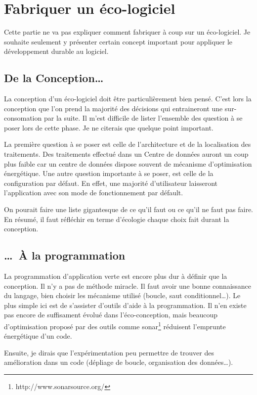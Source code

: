 \documentclass[a4paper, 11pt]{report}
\begin{document}
	\section{Fabriquer un éco-logiciel}
Cette partie ne va pas expliquer comment fabriquer à coup sur un éco-logiciel. Je souhaite seulement y présenter certain concept important pour appliquer le développement durable au logiciel.
		\subsection{De la Conception\ldots}
La conception d'un éco-logiciel doit être particulièrement bien pensé. C'est lors la conception que l'on prend la majorité des décisions qui entraineront une sur-consomation par la suite. Il m'est difficile de lister l'ensemble des question à se poser lors de cette phase. Je ne citerais que quelque point important.

La première question à se poser est celle de l'architecture et de la localisation des traitements\cite{EcoLogiciels}. Des traitements effectué dans un Centre de données auront un coup plus faible car un centre de données dispose souvent de mécanisme d'optimisation énergétique. Une autre question importante à se poser, est celle de la configuration par défaut\cite{GreenPattern}. En effet, une majorité d'utilisateur laisseront l'application avec son mode de fonctionnement par défault.

On pourait faire une liste gigantesque de ce qu'il faut ou ce qu'il ne faut pas faire. En résumé, il faut réfléchir en terme d'écologie chaque choix  fait durant la conception.

		\subsection{\ldots~À la programmation}
La programmation d'application verte est encore plus dur à définir que la conception. Il n'y a pas de méthode miracle. Il faut avoir une bonne connaissance du langage, bien choisir les mécanisme utilisé (boucle, saut conditionnel\ldots). Le plus simple ici est de s'assister d'outils d'aide à la programmation. Il n'en existe pas encore de suffisament évolué dans l'éco-conception, mais beaucoup d'optimisation proposé par des outils comme sonar\footnote{http://www.sonarsource.org/} réduisent l'emprunte énergétique d'un code.

Ensuite, je dirais que l'expérimentation peu permettre de trouver des amélioration dans un code (dépliage de boucle, organisation des données\ldots).
\end{document}
